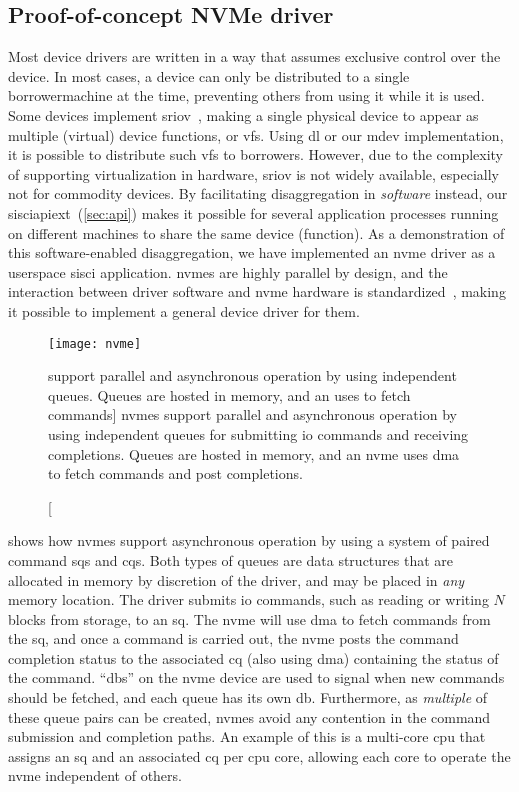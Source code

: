 \subsection{Proof-of-concept NVMe driver}\label{sec:nvme-driver}
Most device drivers are written in a way that assumes exclusive control over the device.
%
In most cases, a device can only be distributed to a single \gls{borrowermachine} at the time, preventing others from using it while it is used.
%
Some devices implement \gls{sriov}~\cite{spec:SRIOV}, making a single physical device to appear as multiple (virtual) device functions, or \glspl{vf}.
%
Using \gls{dl} or our \gls{mdev} implementation, it is possible to distribute such \glspl{vf} to \glspl{borrower}.
%
However, due to the complexity of supporting virtualization in hardware, \gls{sriov} is not widely available, especially not for commodity devices.
%
By facilitating \gls{disaggregation} in \emph{software} instead, our \gls{sisciapiext}~(\cref{sec:api}) makes it possible for several application processes running on different machines to share the same device (\gls{function}).
%
As a demonstration of this software-enabled \gls{disaggregation}, we have implemented an \gls{nvme} driver as a \gls{userspace} \gls{sisci} application.
%
\Glspl{nvme} are highly parallel by design, and the interaction between driver software and \gls{nvme} hardware is standardized~\cite{spec:NVMe}, making it possible to implement a general device driver for them.


\begin{figure}
    \centering
    \texttt{[image: nvme]}
    \caption
    [ support parallel and asynchronous operation by using independent queues. Queues are hosted in memory, and an  uses  to fetch commands]
    {\Glspl{nvme} support parallel and asynchronous operation by using independent queues for submitting \gls{io} commands and receiving completions. Queues are hosted in memory, and an \gls{nvme} uses \gls{dma} to fetch commands and post completions.}
    \label{fig:nvme}
\end{figure}



 shows how \glspl{nvme} support asynchronous operation by using a system of paired command \glspl{sq} and \glspl{cq}.
%
Both types of queues are data structures that are allocated in memory by discretion of the driver, and may be placed in \emph{any} memory location.
%
The driver submits \gls{io} commands, such as reading or writing $N$ blocks from storage, to an \gls{sq}.
%
The \gls{nvme} will use \gls{dma} to fetch commands from the \gls{sq}, and once a command is carried out, the \gls{nvme} posts the command completion status to the associated \gls{cq} (also using \gls{dma}) containing the status of the command.
%
``\Glspl{db}'' on the \gls{nvme} device are used to signal when new commands should be fetched, and each queue has its own \gls{db}.
%
Furthermore, as \emph{multiple} of these queue pairs can be created, \glspl{nvme} avoid any contention in the command submission and completion paths.
%
An example of this is a multi-core \gls{cpu} that assigns an \gls{sq} and an associated \gls{cq} per \gls{cpu} core, allowing each core to operate the \gls{nvme} independent of others.


